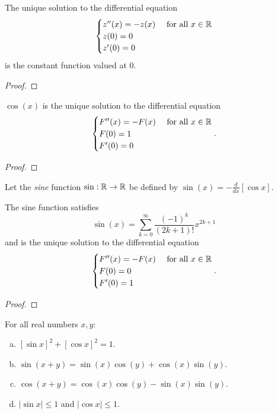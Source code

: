 \documentclass[letterpaper, twoside, 12pt]{book}
\begin{document}
\begin{lemma}[5.5]
  The unique solution to the differential equation
  \[
    \begin{cases}
      z''(x)=-z(x) & \text{ for all } x\in \mathbb R \\
      z(0)=0 \\
      z'(0)=0
    \end{cases}
  \]
  is the constant function valued at \(0\).
\end{lemma}
\begin{proof}

\end{proof}


\begin{corollary}
  \(\cos(x)\) is the unique solution to the differential equation
  \[
    \begin{cases}
      F''(x)=-F(x) & \text{ for all } x\in \mathbb R \\
      F(0)=1 \\
      F'(0)=0
    \end{cases}
  .\]
\end{corollary}
\begin{proof}

\end{proof}

\begin{definition}
  Let the \textit{sine} function
  \(\sin:\mathbb R\to\mathbb R\) be defined by \(\sin(x)=-\frac{d}{dx}[\cos x]\).
\end{definition}

\begin{theorem}
  The sine function satisfies
  \[
    \sin(x)
      =
    \sum_{k=0}^\infty
    \frac{(-1)^k}{(2k+1)!}x^{2k+1}
  \]
  and is the unique solution to the differential equation
  \[
    \begin{cases}
      F''(x)=-F(x) & \text{ for all } x\in \mathbb R \\
      F(0)=0 \\
      F'(0)=1
    \end{cases}
  .\]
\end{theorem}
\begin{proof}

\end{proof}

\begin{theorem}[5.6]
  For all real numbers \(x,y\):
  \begin{enumerate}[(a)]
    \item \([\sin x]^2+[\cos x]^2=1\).
    \item \(\sin(x+y)=\sin(x)\cos(y)+\cos(x)\sin(y)\).
    \item \(\cos(x+y)=\cos(x)\cos(y)-\sin(x)\sin(y)\).
    \item \(|\sin x|\leq 1\) and \(|\cos x|\leq 1\).
  \end{enumerate}
\end{theorem}
\end{document}
